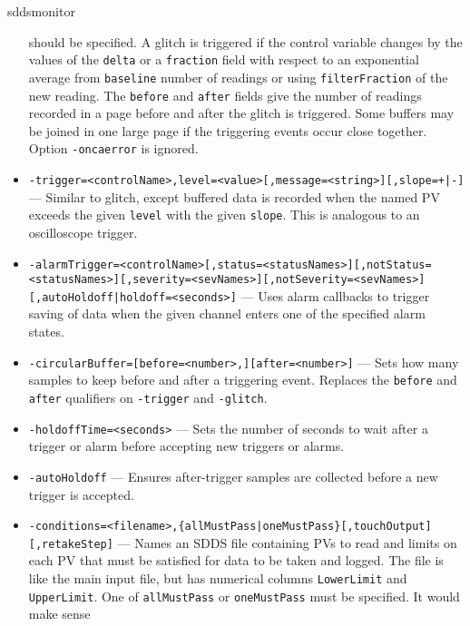 \begin{sddsprog}{sddsmonitor}
\begin{itemize}
                should be specified. A glitch is triggered if the control
                variable changes by the values of the \verb+delta+ or a \verb+fraction+ field with respect to an exponential
                average from \verb+baseline+ number of readings or using \verb+filterFraction+ of the new reading.
                The \verb+before+ and \verb+after+ fields give the number of readings recorded in a page
                before and after the glitch is triggered. Some buffers may be joined in
                one large page if the triggering events occur close together.
                Option \verb+-oncaerror+ is ignored.
        \item {\tt -trigger=<controlName>,level=<value>[,message=<string>][,slope={+|-}] \newline
[,before=<number>][,after=<number>][,autoArm][,{autoHoldoff|holdoff=<seconds>}]} --- Similar to glitch,
                except buffered data is recorded when the named PV exceeds
                the given \verb+level+ with the given \verb+slope+. This is analogous to an oscilloscope
                trigger.
        \item {\tt -alarmTrigger=<controlName>[,status=<statusNames>][,notStatus=<statusNames>][,severity=<sevNames>][,notSeverity=<sevNames>][,{autoHoldoff|holdoff=<seconds>}]} ---
                Uses alarm callbacks to trigger saving of data when the given channel enters one
                of the specified alarm states.
        \item {\tt -circularBuffer=[before=<number>,][after=<number>]} --- Sets how many samples to keep before and after
                a triggering event. Replaces the \verb+before+ and \verb+after+ qualifiers on \verb+-trigger+ and \verb+-glitch+.
        \item {\tt -holdoffTime=<seconds>} --- Sets the number of seconds to wait after a trigger or alarm
                before accepting new triggers or alarms.
        \item {\tt -autoHoldoff} --- Ensures after-trigger samples are collected before a new trigger is accepted.
        \item {\verb+-conditions=<filename>,{allMustPass|oneMustPass}[,touchOutput][,retakeStep]+} ---
                Names an SDDS file containing PVs to read and limits on each PV that must
                be satisfied for data to be taken and logged. The file is like the main
                input file, but has numerical columns \verb+LowerLimit+ and \verb+UpperLimit+.
                One of \verb+allMustPass+ or \verb+oneMustPass+ must be specified. It would make sense

\end{itemize}
\end{sddsprog}
